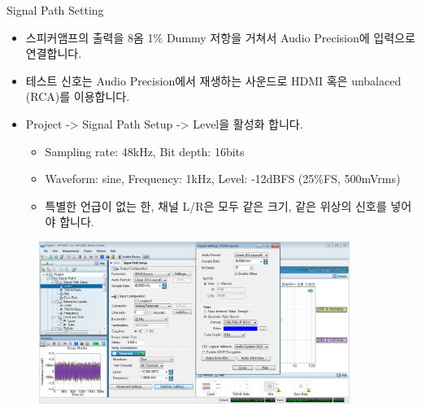 \documentclass{beamer}
\begin{document}
\begin{frame}[t]{Signal Path Setting}
\begin{itemize}
\item 스피커앰프의 출력을 8옴 1\% Dummy 저항을 거쳐서 Audio Precision에 입력으로 연결합니다.
\item 테스트 신호는 Audio Precision에서 재생하는 사운드로 HDMI 혹은 unbalaced (RCA)를 이용합니다.
\item Project -> Signal Path Setup -> Level을 활성화 합니다.
	\begin{itemize}
	\item Sampling rate: 48kHz, Bit depth: 16bits
	\item Waveform: sine, Frequency: 1kHz, Level: -12dBFS (25\%FS, 500mVrms)
	\item 특별한 언급이 없는 한, 채널 L/R은 모두 같은 크기, 같은 위상의 신호를 넣어야 합니다.
	\end{itemize}
\end{itemize}

\begin{figure}[b]
\includegraphics[width=0.9\textwidth]{figure/apsetting/signalPath.png}
\end{figure}

\end{frame}
\end{document}
